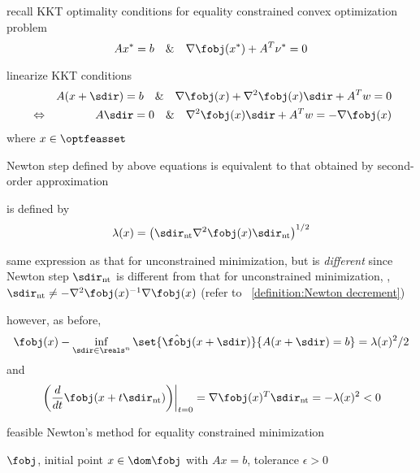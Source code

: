 \documentclass[17pt,landscape]{foils}
\begin{document}
{

\bit
\item
	recall KKT optimality conditions for equality constrained convex optimization problem
	$$
		Ax^\ast = b
		\quad
		\&
		\quad
		\nabla \fobj(x^\ast) + A^T\nu^\ast = 0
	$$

\vitem
	linearize KKT conditions
	\begin{eqnarray*}
	&&
		A(x+\sdir) = b
		\quad
		\&
		\quad
		\nabla \fobj(x) + \nabla^2 \fobj(x) \sdir + A^Tw = 0
	\\
	&\Leftrightarrow&
		A\sdir = 0
		\quad
		\&
		\quad
		\nabla^2 \fobj(x) \sdir + A^Tw
		=
		- \nabla \fobj(x)
	\end{eqnarray*}
	where $x\in\optfeasset$

\vitem
	Newton step defined by above equations
	is equivalent
	to
	that obtained by second-order approximation
\eit
\vfill



\bit
\item
	is defined by
	$$
		\lambda(x)
		=
		\left(\sdir_\mathrm{nt} \nabla^2 \fobj(x) \sdir_\mathrm{nt}\right)^{1/2}
	$$
%

\vitem
	same expression as that for unconstrained minimization,
	but is \emph{different}
	since Newton step $\sdir_\mathrm{nt}$ is different from that for unconstrained minimization,
	\ie, $\sdir_\mathrm{nt} \neq -\nabla^2 \fobj(x)^{-1} \nabla \fobj(x)$
	(refer to ~\ref{definition:Newton decrement})

\vitem
	however, as before,
	$$
		\fobj(x) - \inf_{\sdir\in\reals^n}\set{\hat{\fobj}(x+\sdir)}{A(x+\sdir)=b}
		= \lambda(x)^2/2
	$$
	and
	$$
		\left.
		\left(
		\frac{d}{dt}\fobj(x+t\sdir_\mathrm{nt})
		\right)
		\right|_{t=0}
		=
		\nabla \fobj(x) ^T \sdir_\mathrm{nt}
		=
		- \lambda(x)^2
		<0
	$$
\eit
\vfill



\begin{myalgorithm}{feasible Newton's method for equality constrained minimization}\;%
\begin{algorithmic}
\Require $\fobj$, initial point $x\in \dom \fobj$ with $Ax=b$, tolerance $\epsilon>0$
\Loop
\EndLoop
\end{algorithmic}
\end{myalgorithm}

}
\end{document}

